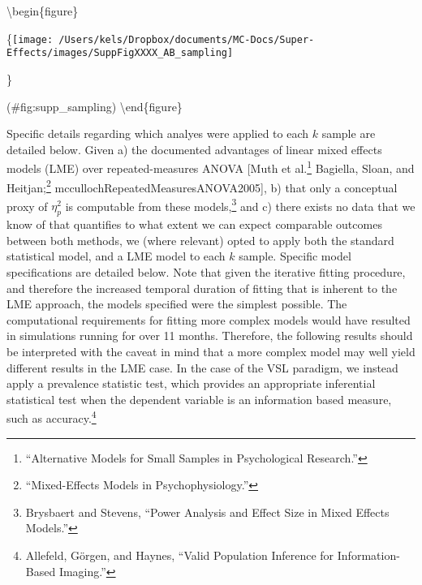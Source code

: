 \documentclass[
  12pt,
]{article}
\begin{document}
\textbackslash begin\{figure\}

\{\centering \texttt{[image: /Users/kels/Dropbox/documents/MC-Docs/Super-Effects/images/SuppFigXXXX\_AB\_sampling]}

\}

\caption{Supplemental Figure xxxx: Comparison between sampling procedures for the AB task data fit with a repeated measures ANOVA for 4 levels of N; densities of observed effect sizes for the A) two-step sampling procedure j=1000^k=1000, the B) two-step sampling procedure, j=1^k=1000, and C) the one-step procedure, $k$ = 1000}

(\#fig:supp\_sampling)
\textbackslash end\{figure\}

Specific details regarding which analyes were applied to each \(k\) sample are detailed below. Given a) the documented advantages of linear mixed effects models (LME) over repeated-measures ANOVA {[}Muth et al.\footnote{``Alternative Models for Small Samples in Psychological Research.''} Bagiella, Sloan, and Heitjan;\footnote{``Mixed-Effects Models in Psychophysiology.''} mccullochRepeatedMeasuresANOVA2005{]}, b) that only a conceptual proxy of \(\eta_{p}^{2}\) is computable from these models,\footnote{Brysbaert and Stevens, ``Power Analysis and Effect Size in Mixed Effects Models.''} and c) there exists no data that we know of that quantifies to what extent we can expect comparable outcomes between both methods, we (where relevant) opted to apply both the standard statistical model, and a LME model to each \(k\) sample. Specific model specifications are detailed below. Note that given the iterative fitting procedure, and therefore the increased temporal duration of fitting that is inherent to the LME approach, the models specified were the simplest possible. The computational requirements for fitting more complex models would have resulted in simulations running for over 11 months. Therefore, the following results should be interpreted with the caveat in mind that a more complex model may well yield different results in the LME case. In the case of the VSL paradigm, we instead apply a prevalence statistic test, which provides an appropriate inferential statistical test when the dependent variable is an information based measure, such as accuracy.\footnote{Allefeld, Görgen, and Haynes, ``Valid Population Inference for Information-Based Imaging.''}
\end{document}
